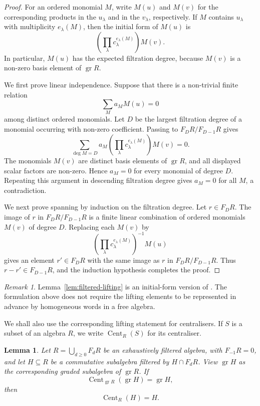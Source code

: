 \documentclass[11pt]{extarticle}
\newtheorem{lemma}[theorem]{Lemma}
\theoremstyle{definition}
\theoremstyle{remark}
\newtheorem{remark}[theorem]{Remark}
\numberwithin{equation}{section}
\newcommand{\gr}{\operatorname{gr}}
\DeclareMathOperator{\Cent}{Cent}
\begin{document}
\begin{proof}
For an ordered monomial \(M\), write \(M(u)\) and \(M(v)\) for the
corresponding products in the \(u_\lambda\) and in the \(v_\lambda\),
respectively.  If \(M\) contains \(u_\lambda\) with multiplicity
\(e_\lambda(M)\), then the initial form of \(M(u)\) is
\[
        \left(\prod_\lambda c_\lambda^{e_\lambda(M)}\right)M(v).
\]
In particular, \(M(u)\) has the expected filtration degree, because
\(M(v)\) is a non-zero basis element of \(\gr R\).

We first prove linear independence.  Suppose that there is a non-trivial
finite relation
\[
        \sum_M a_M M(u)=0
\]
among distinct ordered monomials.  Let \(D\) be the largest filtration
degree of a monomial occurring with non-zero coefficient.  Passing to
\(F_DR/F_{D-1}R\) gives
\[
 \sum_{\deg M=D}
 a_M\left(\prod_\lambda c_\lambda^{e_\lambda(M)}\right)M(v)=0 .
\]
The monomials \(M(v)\) are distinct basis elements of \(\gr R\), and all
displayed scalar factors are non-zero.  Hence \(a_M=0\) for every monomial
of degree \(D\).  Repeating this argument in descending filtration degree
gives \(a_M=0\) for all \(M\), a contradiction.

We next prove spanning by induction on the filtration degree.  Let
\(r\in F_DR\).  The image of \(r\) in \(F_DR/F_{D-1}R\) is a finite linear
combination of ordered monomials \(M(v)\) of degree \(D\).  Replacing each
\(M(v)\) by
\[
        \left(\prod_\lambda c_\lambda^{e_\lambda(M)}\right)^{-1}M(u)
\]
gives an element \(r'\in F_DR\) with the same image as \(r\) in
\(F_DR/F_{D-1}R\).  Thus \(r-r'\in F_{D-1}R\), and the induction hypothesis
completes the proof.
\end{proof}

\begin{remark}
Lemma~\ref{lem:filtered-lifting} is an initial-form version of
\cite[Proposition~4.6]{Terwilliger2017PositivePart}.  The formulation above
does not require the lifting elements to be represented in advance by
homogeneous words in a free algebra.
\end{remark}

We shall also use the corresponding lifting statement for centralisers.  If
\(S\) is a subset of an algebra \(R\), we write \(\Cent_R(S)\) for its
centraliser.

\begin{lemma}\label{lem:filtered-centraliser}
Let \(R=\bigcup_{d\geq0}F_dR\) be an exhaustively filtered algebra, with
\(F_{-1}R=0\), and let \(H\subseteq R\) be a commutative subalgebra filtered
by \(H\cap F_dR\).  View \(\gr H\) as the corresponding graded subalgebra of
\(\gr R\).  If
\[
        \Cent_{\gr R}(\gr H)=\gr H,
\]
then
\[
        \Cent_R(H)=H .
\]
\end{lemma}
\end{document}
